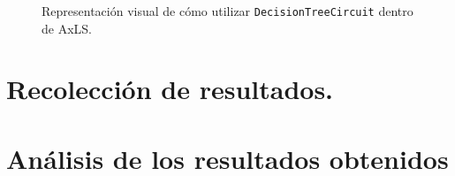\begin{figure}[htb]
  \centering
  
  \caption{Representación visual de cómo utilizar \texttt{DecisionTreeCircuit} dentro de AxLS.}
  \label{fig:flow}
\end{figure}

\section{Recolección de resultados.}

%

\section{Análisis de los resultados obtenidos}
